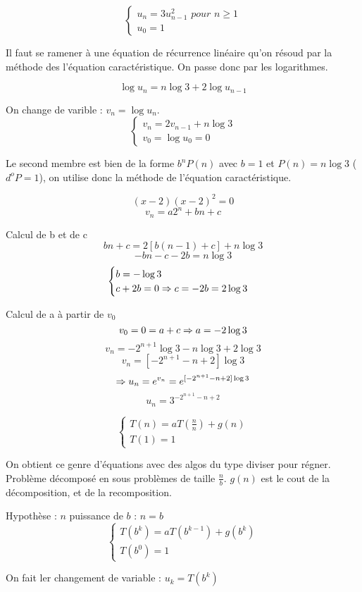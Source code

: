 \begin{exercice}

\[ \begin{cases} u_n=3u_{n-1}^2 \textit{ pour } n \ge 1 \\ u_0=1 \end{cases} \]

Il faut se ramener à une équation de récurrence linéaire qu'on résoud par la méthode des l'équation caractéristique. On passe donc par les logarithmes.

\[ \log u_n =n\log 3+2\log u_{n-1} \]

On change de varible : $v_n=\log u_n$.
\[ \begin{cases} v_n=2v_{n-1}+n\log 3 \\
v_0=\log u_0=0 \end{cases} \]

Le second membre est bien de la forme $b^nP(n)$ avec $b=1$ et $P(n)=n\log 3$ ($d^o P=1$), on utilise donc la méthode de l'équation caractéristique.

\[ (x-2)(x-2)^2=0 \]
\[ v_n=a2^n+bn+c \]

Calcul de b et de c
\[ bn+c=2[b(n-1)+c]+n\log 3 \]
\[ -bn-c-2b=n\log 3\]
\[ \begin{cases} b=-\log 3 \\ c+2b=0 \Rightarrow c=-2b=2\log 3 \end{cases} \]

Calcul de a à partir de $v_0$
\[ v_0=0=a+c \Rightarrow a=-2\log 3 \]
\[ v_n=-2^{n+1}\log 3-n\log 3+2\log3 \]
\[ v_n=[-2^{n+1}-n+2]\log 3 \]
\[ \Rightarrow u_n=e^{v_n}=e^{[-2^{n+1}-n+2]\log 3} \]
\[ u_n=3^{-2^{n+1}-n+2} \]

\end{exercice}

\begin{exercice}

\[ \begin{cases} T(n)=aT(\frac{n}{n})+g(n) \\ T(1)=1 \end{cases} \]

On obtient ce genre d'équations avec des algos du type diviser pour régner. Problème décomposé en sous problèmes de taille $\frac{n}{b}$. $g(n)$ est le cout de la décomposition, et de la recomposition.

Hypothèse : $n$ puissance de $b$ : $n=b$
\[ \begin{cases} T(b^k)=aT(b^{k-1})+g(b^k) \\ T(b^0)=1 \end{cases} \]

On fait ler changement de variable : $u_k=T(b^k)$


\end{exercice}


